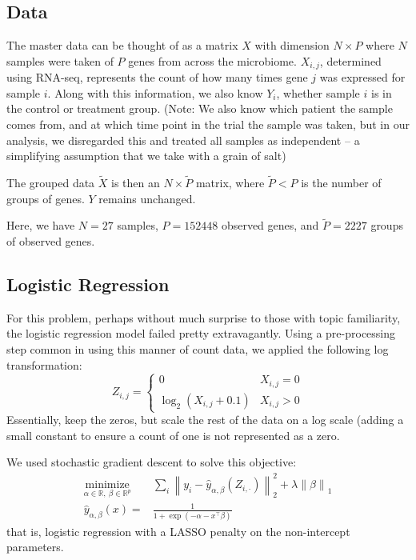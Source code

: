 \documentclass{article}
\newcommand{\op}[2]{{\ensuremath{\underset{ #2 }{\operatorname{ #1 }}~}}}
\newcommand{\norm}[1]{{ \ensuremath{ \left\lVert  #1 \right\rVert  }  }}
\newcommand{\R}{ \ensuremath{ \mathbb{R} }}
\begin{document}
\subsection{Data}

The master data can be thought of as a matrix $X$ with dimension $N\times P$ where $N$ samples were taken
of $P$ genes from across the microbiome. $X_{i,j}$, determined using RNA-seq, represents the count of how many
times gene $j$ was expressed for sample $i$. Along with this information, we also know $Y_i$, whether sample
$i$ is in the control or treatment group. (Note: We also know which patient the sample comes from, and at which time point in the trial the sample was taken, but in
our analysis, we disregarded this and treated all samples as independent -- a simplifying assumption that we
take with a grain of salt)

The grouped data $\tilde{X}$ is then an $N\times \tilde{P}$ matrix, where $\tilde{P} < P$ is the number of groups
of genes. $Y$ remains unchanged.

Here, we have $N=27$ samples, $P=152448$ observed genes, and $\tilde{P}=2227$ groups of observed genes.

\subsection{Logistic Regression}

For this problem, perhaps without much surprise to those with topic familiarity, the logistic regression model
failed pretty extravagantly. Using a pre-processing step common in using this manner of count data, we applied
the following log transformation:
$$Z_{i,j}=\left\{\begin{array}{cc}
0 & X_{i,j}=0\\
\log_2 (X_{i,j}+0.1) & X_{i,j} > 0
\end{array}\right.$$
Essentially, keep the zeros, but scale the rest of the data on a log scale (adding a small constant to ensure
a count of one is not represented as a zero.

We used stochastic gradient descent to solve this objective:
\begin{align*}
\op{minimize}{\alpha \in \R,~\beta \in \R^p}& \sum_i \norm{y_i - \hat{y}_{\alpha,\beta}(Z_{i,\cdot})}_2^2 + \lambda \norm{\beta}_1\\
\hat{y}_{\alpha, \beta}(x)=&\frac{1}{1+\exp\left(- \alpha - x^\top \beta \right)}
\end{align*}
that is, logistic regression with a LASSO penalty on the non-intercept parameters.
\end{document}
